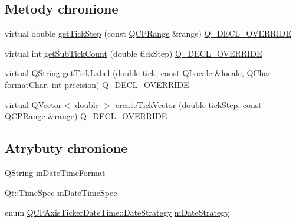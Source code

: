 \subsection*{Metody chronione}
\begin{DoxyCompactItemize}
\item 
virtual double \hyperlink{class_q_c_p_axis_ticker_date_time_a0560c14a3f87bb99ab136aca8321b32a}{get\+Tick\+Step} (const \hyperlink{class_q_c_p_range}{Q\+C\+P\+Range} \&range) \hyperlink{qcustomplot_8hh_a42cc5eaeb25b85f8b52d2a4b94c56f55}{Q\+\_\+\+D\+E\+C\+L\+\_\+\+O\+V\+E\+R\+R\+I\+DE}
\item 
virtual int \hyperlink{class_q_c_p_axis_ticker_date_time_a78dece0d51426a3c310528d413e09193}{get\+Sub\+Tick\+Count} (double tick\+Step) \hyperlink{qcustomplot_8hh_a42cc5eaeb25b85f8b52d2a4b94c56f55}{Q\+\_\+\+D\+E\+C\+L\+\_\+\+O\+V\+E\+R\+R\+I\+DE}
\item 
virtual Q\+String \hyperlink{class_q_c_p_axis_ticker_date_time_a4dc6a03f7ea5c619477528a683ed5c18}{get\+Tick\+Label} (double tick, const Q\+Locale \&locale, Q\+Char format\+Char, int precision) \hyperlink{qcustomplot_8hh_a42cc5eaeb25b85f8b52d2a4b94c56f55}{Q\+\_\+\+D\+E\+C\+L\+\_\+\+O\+V\+E\+R\+R\+I\+DE}
\item 
virtual Q\+Vector$<$ double $>$ \hyperlink{class_q_c_p_axis_ticker_date_time_a44c2c09a303d281801b69226e243047d}{create\+Tick\+Vector} (double tick\+Step, const \hyperlink{class_q_c_p_range}{Q\+C\+P\+Range} \&range) \hyperlink{qcustomplot_8hh_a42cc5eaeb25b85f8b52d2a4b94c56f55}{Q\+\_\+\+D\+E\+C\+L\+\_\+\+O\+V\+E\+R\+R\+I\+DE}
\end{DoxyCompactItemize}
\subsection*{Atrybuty chronione}
\begin{DoxyCompactItemize}
\item 
Q\+String \hyperlink{class_q_c_p_axis_ticker_date_time_adbbb25add598377998c0c57dbd29adaf}{m\+Date\+Time\+Format}
\item 
Qt\+::\+Time\+Spec \hyperlink{class_q_c_p_axis_ticker_date_time_a5f5abe83c371f13eb3415585e638dba9}{m\+Date\+Time\+Spec}
\item 
enum \hyperlink{class_q_c_p_axis_ticker_date_time_af2c7c60821a6234ca7a172f42ef7f1d8}{Q\+C\+P\+Axis\+Ticker\+Date\+Time\+::\+Date\+Strategy} \hyperlink{class_q_c_p_axis_ticker_date_time_a93fca912446ca341bee277cb2cc84e49}{m\+Date\+Strategy}
\end{DoxyCompactItemize}

